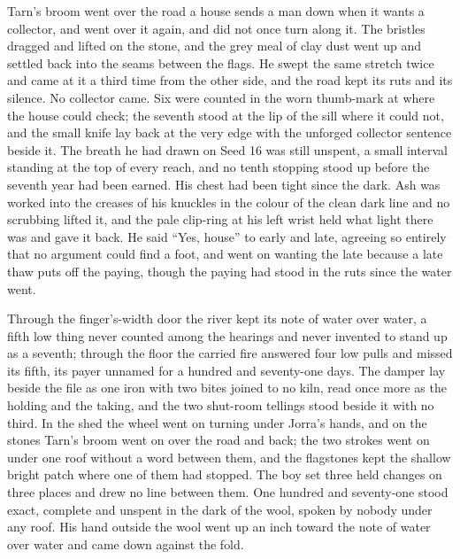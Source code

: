 Tarn's broom went over the road a house sends a man down when it wants a collector, and went over it again, and did not once turn along it. The bristles dragged and lifted on the stone, and the grey meal of clay dust went up and settled back into the seams between the flags. He swept the same stretch twice and came at it a third time from the other side, and the road kept its ruts and its silence. No collector came. Six were counted in the worn thumb-mark at  where the house could check; the seventh stood at the lip of the sill where it could not, and the small knife lay back at the very edge with the unforged collector sentence beside it. The breath he had drawn on Seed 16 was still unspent, a small interval standing at the top of every reach, and no tenth stopping stood up before the seventh year had been earned. His chest had been tight since the dark. Ash was worked into the creases of his knuckles in the colour of the clean dark line and no scrubbing lifted it, and the pale clip-ring at his left wrist held what light there was and gave it back. He said “Yes, house” to  early and late, agreeing so entirely that no argument could find a foot, and went on wanting the late because a late thaw puts off the paying, though the paying had stood in the ruts since the water went.

Through the finger's-width door the river kept its note of water over water, a fifth low thing never counted among the hearings and never invented to stand up as a seventh; through the floor the carried fire answered four low pulls and missed its fifth, its payer unnamed for a hundred and seventy-one days. The damper lay beside the file as one iron with two bites joined to no kiln, read once more as the holding and the taking, and the two shut-room tellings stood beside it with no third. In the shed the wheel went on turning under Jorra's hands, and on the stones Tarn's broom went on over the road and back; the two strokes went on under one roof without a word between them, and the flagstones kept the shallow bright patch where one of them had stopped. The boy set three held changes on three places and drew no line between them. One hundred and seventy-one stood exact, complete and unspent in the dark of the wool, spoken by nobody under any roof. His hand outside the wool went up an inch toward the note of water over water and came down against the fold.
